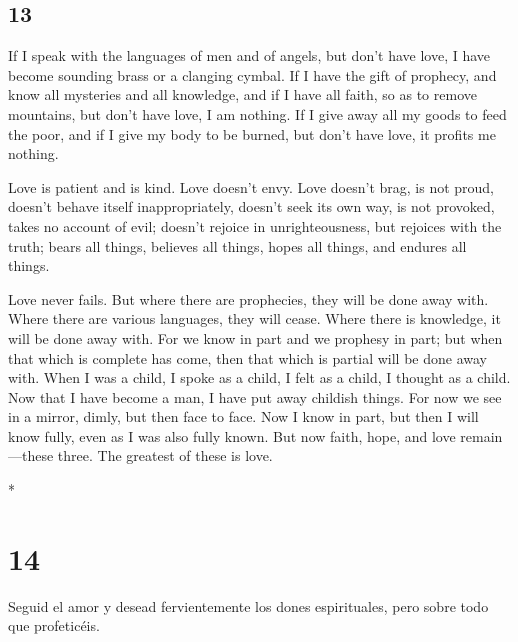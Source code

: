 \begin{paracol}{2}
\switchcolumn
\begin{otherlanguage}{english}

\hypertarget{section-25}{%
\section{13}\label{section-25}}

 If I speak with the languages of men and of angels, but
don't have love, I have become sounding brass or a clanging cymbal.
 If I have the gift of prophecy, and know all mysteries
and all knowledge, and if I have all faith, so as to remove mountains,
but don't have love, I am nothing.  If I give away all my
goods to feed the poor, and if I give my body to be burned, but don't
have love, it profits me nothing.

 Love is patient and is kind. Love doesn't envy. Love
doesn't brag, is not proud,  doesn't behave itself
inappropriately, doesn't seek its own way, is not provoked, takes no
account of evil;  doesn't rejoice in unrighteousness, but
rejoices with the truth;  bears all things, believes all
things, hopes all things, and endures all things.

 Love never fails. But where there are prophecies, they
will be done away with. Where there are various languages, they will
cease. Where there is knowledge, it will be done away with.
 For we know in part and we prophesy in part;
 but when that which is complete has come, then that
which is partial will be done away with.  When I was a
child, I spoke as a child, I felt as a child, I thought as a child. Now
that I have become a man, I have put away childish things.
 For now we see in a mirror, dimly, but then face to
face. Now I know in part, but then I will know fully, even as I was also
fully known.  But now faith, hope, and love
remain---these three. The greatest of these is love.

\end{otherlanguage}

\switchcolumn[0]*

\hypertarget{section-26}{%
\section{14}\label{section-26}}

 Seguid el amor y desead fervientemente los dones
espirituales, pero sobre todo que profeticéis.


\end{paracol}

